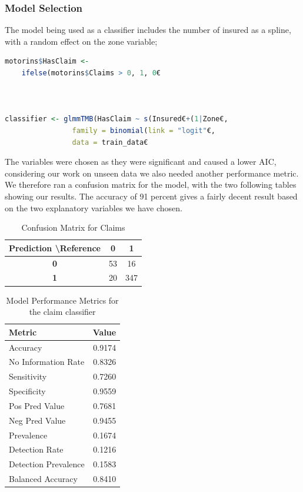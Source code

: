 \documentclass[12pt, twoside,hidelinks]{article}
\theoremstyle{definition}
\numberwithin{equation}{section}
\begin{document}
\subsubsection{Model Selection}
The model being used as a classifier includes the number of insured as a spline, with a random effect on the zone variable;
\newline 

\begin{lstlisting}[language=R]
motorins$HasClaim <- 
    ifelse(motorins$Claims > 0, 1, 0€



classifier <- glmmTMB(HasClaim ~ s(Insured€+(1|Zone€,
                family = binomial(link = "logit"€,
                data = train_data€
\end{lstlisting}
The variables were chosen as they were significant and caused a lower AIC, considering our work on unseen data we also needed another performance metric. We therefore ran a confusion matrix for the model, with the two following tables showing our results. The accuracy of 91 percent gives a fairly decent result based on the two explanatory variables we have chosen.

\begin{table}[H]
\centering
\begin{tabular}{ccc}
\hline
\textbf{Prediction} \textbackslash \textbf{Reference} & \textbf{0} & \textbf{1} \\ \hline
\textbf{0} & 53 & 16 \\
\textbf{1} & 20 & 347 \\ \hline
\end{tabular}
\caption{Confusion Matrix for Claims}
\label{tab:confusion_matrix}
\end{table}


\begin{table}[H]
\centering
\begin{tabular}{@{}lr@{}}
\toprule
\textbf{Metric}            & \textbf{Value} \\ \midrule
Accuracy                   & 0.9174         \\
No Information Rate        & 0.8326         \\
Sensitivity                & 0.7260         \\
Specificity                & 0.9559         \\
Pos Pred Value             & 0.7681         \\
Neg Pred Value             & 0.9455         \\
Prevalence                 & 0.1674         \\
Detection Rate             & 0.1216         \\
Detection Prevalence       & 0.1583         \\
Balanced Accuracy          & 0.8410         \\ \bottomrule
\end{tabular}
\caption{Model Performance Metrics for the claim classifier}
\label{tab:logitregression:}
\end{table}
\end{document}
